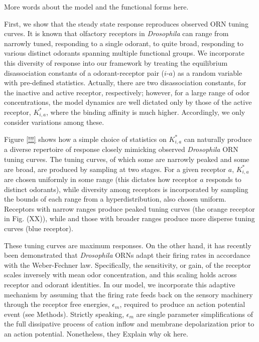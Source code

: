 {\color {blue} More words about the model and the functional forms here.}

First, we show that the steady state response reproduces observed ORN tuning curves. It is known that olfactory receptors in \textit{Drosophila} can range from narrowly tuned, responding to a single odorant, to quite broad, responding to various distinct odorants spanning multiple functional groups. We incorporate this diversity of response into our framework by treating the equilibrium disassociation constants of a odorant-receptor pair ($i$-$a$) as a random variable with pre-defined statistics. Actually, there are two disassociation constants, for the inactive and active receptor, respectively; however, for a large range of odor concentrations, the model dynamics are well dictated only by those of the active receptor, $K^*_{i, a}$, where the binding affinity is much higher. Accordingly, we only consider variations among these. 

Figure \ref{!!!} shows how a simple choice of statistics on $K^*_{i, a}$ can naturally produce a diverse repertoire of response closely mimicking observed \textit{Drosophila} ORN tuning curves. The tuning curves, of which some are narrowly peaked and some are broad, are produced by sampling at two stages. For a given receptor $a$, $K^*_{i,a}$ are chosen uniformly in some range (this dictates how receptor $a$ responds to distinct odorants), while diversity among receptors is incorporated by sampling the bounds of each range from a hyperdistribution, also chosen uniform. Receptors with narrow ranges produce peaked tuning curves (the orange receptor in Fig. (XX)), while and those with broader ranges produce more disperse tuning curves (blue receptor). 


These tuning curves are maximum responses. On the other hand, it has recently been demonstrated that \textit{Drosophila} ORNs adapt their firing rates in accordance with the Weber-Fechner law. Specifically, the sensitivity, or gain, of the receptor scales inversely with mean odor concentration, and this scaling holds across receptor and odorant identities. In our model, we incorporate this adaptive mechanism by assuming that the firing rate feeds back on the sensory machinery through the receptor free energies, $\epsilon_m$, required to produce an action potential event (see Methods). Strictly speaking, $\epsilon_m$ are single parameter simplifications of the full dissipative process of cation inflow and membrane depolarization prior to an action potential. Nonetheless, they {\color{blue} Explain why ok here}.  

